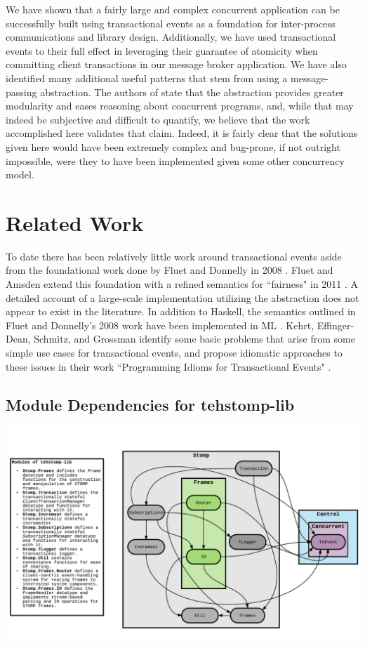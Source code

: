 \documentclass[conference, letterpaper]{IEEEtran}
\begin{document}
We have shown that a fairly large and complex concurrent application can be successfully built using transactional events as a foundation for inter-process communications and library design. Additionally, we have used transactional events to their full effect in leveraging their guarantee of atomicity when committing client transactions in our message broker application. We have also identified many additional useful patterns that stem from using a message-passing abstraction. The authors of \cite{te:original} state that the abstraction provides greater modularity and eases reasoning about concurrent programs, and, while that may indeed be subjective and difficult to quantify, we believe that the work accomplished here validates that claim. Indeed, it is fairly clear that the solutions given here would have been extremely complex and bug-prone, if not outright impossible, were they to have been implemented given some other concurrency model.

\section{Related Work}
To date there has been relatively little work around transactional events aside from the foundational work done by
Fluet and Donnelly in 2008 \cite{te:original}. Fluet and Amsden extend this foundation with a refined semantics  for ``fairness" in 2011 \cite{te:fairness}.
A detailed account of a large-scale implementation utilizing the abstraction does not appear to exist in the literature. 
In addition to Haskell, the semantics outlined in Fluet and Donnelly's 2008 work have been implemented in ML \cite{te:ml}. 
Kehrt, Effinger-Dean, Schmitz, and Grossman identify some basic problems that arise from some simple use cases for
transactional events, and propose idiomatic approaches to these issues in their work ``Programming Idioms for Transactional Events" \cite{te:idioms}.  




\clearpage
\begin{appendices}

\section{Module Dependencies for tehstomp-lib}

\ifCLASSINFOpdf
    \includegraphics[scale=.8]{dependencies.pdf}
\else
\fi

\end{appendices}
\end{document}
